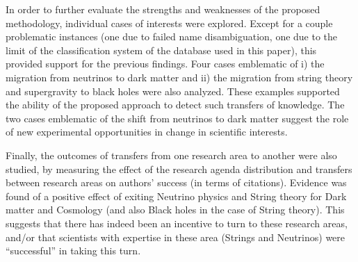 \documentclass{article}
\begin{document}

In order to further evaluate the strengths and weaknesses of the proposed methodology, individual cases of interests were explored.  Except for a couple problematic instances (one due to failed name disambiguation, one due to the limit of the classification system of the database used in this paper), this provided support for the previous findings. Four cases emblematic of i) the migration from neutrinos to dark matter and ii) the migration from string theory and supergravity to black holes were also analyzed. These examples supported the ability of the proposed approach to detect such transfers of knowledge. The two cases emblematic of the shift from neutrinos to dark matter suggest the role of new experimental opportunities in change in scientific interests.

Finally, the outcomes of transfers from one research area to another were also studied, by measuring the effect of the research agenda distribution and transfers between research areas  on authors' success (in terms of citations). Evidence was found of a positive effect of exiting Neutrino physics and String theory for Dark matter and Cosmology (and also Black holes in the case of String theory). This suggests that there has indeed been an incentive to turn to these research areas, and/or that scientists with expertise in these area (Strings and Neutrinos) were ``successful'' in taking this turn.


\end{document}
